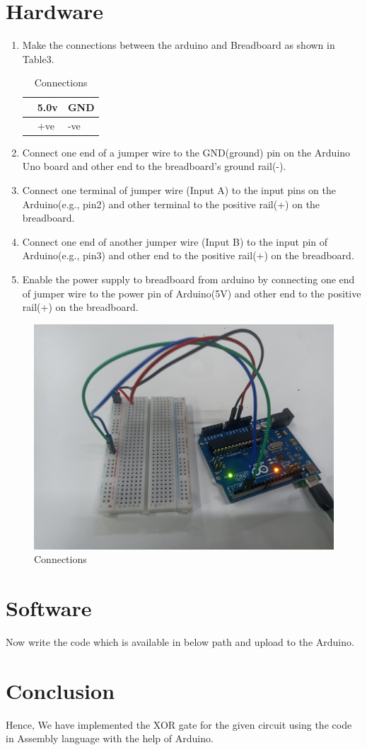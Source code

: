 \documentclass[10pt,a4paper]{article}
\begin{document}
     \section{Hardware}
	     \begin{enumerate}
		     \item Make the connections between the arduino and Breadboard as shown in Table3.
			     \begin{table}[h]
				     \centering
				     \begin{tabularx}{0.5\textwidth}
					     {
						     | >{\centering\arraybackslash}X
						     | >{\centering\arraybackslash}X
						     | >{\centering\arraybackslash}X |}
						     \hline
						     {\bf Arduino} & 5.0v & GND \\
						     \hline
						     {\bf Breadboard} & +ve & -ve  \\
						     \hline
				     \end{tabularx}
				     \caption{\label{Table-3}Connections}
			     \end{table}
			     \item Connect one end of a jumper wire to the GND(ground) pin on the Arduino Uno board and other end to the 
				     breadboard’s ground rail(-).
                             \item Connect one terminal of jumper wire (Input A) to the input pins on the Arduino(e.g., pin2) and other terminal to
				     the positive rail(+) on the breadboard.
			     \item Connect one end of another jumper wire (Input B) to the input pin of Arduino(e.g., pin3) and other end to the 
				     positive rail(+) on the breadboard.
			     \item Enable the power supply to breadboard from arduino by connecting one end of jumper wire to the power pin of
				     Arduino(5V) and other end to the positive rail(+) on the breadboard.
			     
	     \end{enumerate}
	     \begin{figure}[h!]
		     \centering
		     \includegraphics[width=0.3\columnwidth]{assembly.jpg}
		     \caption{Connections}
		     \label{fig:connections}
	     \end{figure}
     \section{Software}
	     Now write the code which is available in below path and upload to the Arduino.\\
	     \section{Conclusion}
	     Hence, We have implemented the XOR gate for the given circuit using the code in Assembly language with the help of Arduino.
\end{document}
